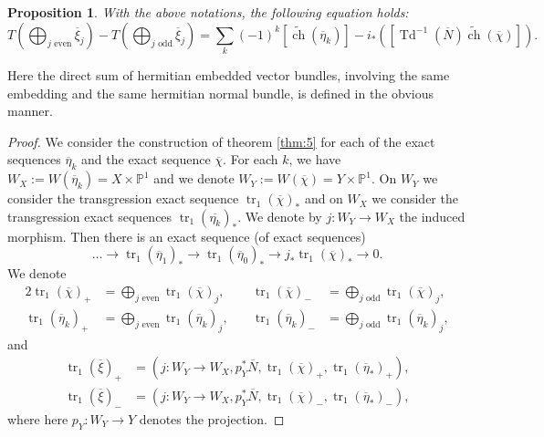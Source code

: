 \documentclass[10pt,twoside]{article}
\numberwithin{equation}{section}
\theoremstyle{plain}
\newtheorem{proposition}[equation]{Proposition}
\theoremstyle{definition}
\DeclareMathOperator{\tr}{tr}
\DeclareMathOperator{\Td}{Td}
\DeclareMathOperator{\ch}{ch}
\begin{document}
\begin{proposition} \label{prop:5}
With the above notations, the following equation holds: 
\begin{displaymath}
  T(\bigoplus_{j \text{ even} }\overline{\xi}_{j}) - T(\bigoplus
  _{j\text{ odd} }\overline {\xi}_j)=
  \sum_{k}(-1)^{k} [\widetilde{\ch}(\overline \eta_{k})]-
i_{\ast}([\Td^{-1}(\overline N)\widetilde{\ch}(\overline{\chi})]).
\end{displaymath}
\end{proposition}
Here the direct sum of hermitian embedded vector bundles, involving
the same embedding and the same hermitian normal bundle, is defined
in the obvious manner.
\begin{proof} We consider the construction of theorem \ref{thm:5} for
  each of the exact sequences $\overline \eta_{k}$ and the exact
  sequence $\overline \chi$. For each $k$, we have $W_{X}:=W(\overline
  \eta_{k})= X\times \mathbb{P}^{1}$ and we denote $W_{Y}:=W(\overline
  \chi)= Y\times \mathbb{P}^{1}$. 
  On $W_{Y}$ we consider the transgression exact
  sequence 
  $\tr_{1}(\overline {\chi})_{\ast}$ and on $W_{X}$ we
  consider the transgression exact sequences $\tr_{1}(\overline
  {\eta_{k}})_{\ast}$. We denote by $j\colon W_{Y}\longrightarrow
  W_{X}$ the induced morphism. Then there is an exact
  sequence (of exact sequences)
  \begin{displaymath}
    \dots \longrightarrow \tr_{1}(\overline \eta_{1})_{\ast }
    \longrightarrow \tr_{1}(\overline \eta_{0})_{\ast }
    \longrightarrow j_{\ast} \tr_{1}(\overline \chi)_{\ast
    }\longrightarrow 0. 
  \end{displaymath}
  We denote
  \begin{alignat*}{2}
    \tr_{1}(\overline \chi)_{+}&=\bigoplus_{j\text{ even} }
    \tr_{1}(\overline \chi)_{j},\quad&
    \tr_{1}(\overline \chi)_{-}&=\bigoplus_{j\text{ odd} }
    \tr_{1}(\overline \chi)_{j},\\
    \tr_{1}(\overline \eta_{k})_{+}&=\bigoplus_{j\text{ even} }
    \tr_{1}(\overline \eta_{k})_{j},\quad &
    \tr_{1}(\overline \eta_{k})_{-}&=\bigoplus_{j\text{ odd} }
    \tr_{1}(\overline \eta_{k})_{j},
  \end{alignat*}
  and
  \begin{align*}
    \tr_{1}(\overline {\xi})_{+}&=(j\colon W_{Y}\longrightarrow 
  W_{X},p_{Y}^{\ast}\overline N,  
  \tr_{1}(\overline \chi)_{+}, \tr_{1}(\overline \eta_{\ast})_{+} ),\\
    \tr_{1}(\overline {\xi})_{-}&=(j\colon W_{Y}\longrightarrow 
  W_{X},p_{Y}^{\ast}\overline N,  
  \tr_{1}(\overline \chi)_{-}, \tr_{1}(\overline \eta_{\ast})_{-} ),
  \end{align*}
where here $p_{Y}\colon W_{Y}\longrightarrow Y$ denotes the projection.


\end{proof}
\end{document}
